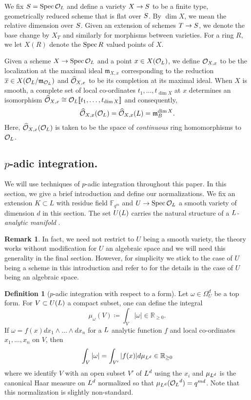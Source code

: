 \documentclass[10pt]{article}
\theoremstyle{plain}
\theoremstyle{definition}
\newtheorem{definition}[theorem]{Definition}
\newtheorem{remark}[theorem]{Remark}
\numberwithin{equation}{section}
\begin{document}
We fix $S= \operatorname{Spec}{{\mathcal O}_{L}}$ and define a variety $X \to S$ to be a finite type, geometrically reduced scheme that is flat over $S$. By $\dim X$, we mean the relative dimension over $S$. Given an extension of schemes $T \to S$, we denote the base change by $X_T$ and similarly for morphisms between varieties. For a ring $R$, we let $X(R)$ denote the $\operatorname{Spec} R$ valued points of $X$. 

Given a scheme $X\to\operatorname{Spec} {{\mathcal O}_{L}}$ and a point $x \in X({{\mathcal O}_{L}})$, we define ${\mathcal O}_{X,x}$ to be the localization at the maximal ideal $\mathfrak m_{X,x}$ corresponding to the reduction $\overline{x} \in X({{\mathcal O}_{L}}/\mathfrak m_{{\mathcal O}_{L}})$ and $\widehat{{\mathcal O}}_{X,x}$ to be its completion at its maximal ideal. When $X$ is smooth, a complete set of local co-ordinates $t_1,\dots,t_{\dim X}$ at $x$ determines an isomorphism $\widehat{{\mathcal O}}_{X,x} \cong { {\mathcal O} _{L}}[\![t_1,\dots,t_{\dim X}]\!]$ and consequently, 
\[\widehat{{\mathcal O}}_{X,x}({{\mathcal O}_{L}}) = \widehat{{\mathcal O}}_{X,x}({L}) = \mathfrak m_B^{\dim X}.\]
Here, $\widehat{{\mathcal O}}_{X,x}({{\mathcal O}_{L}})$ is taken to be the space of \emph{continuous} ring homomorphisms to ${{\mathcal O}_{L}}$.




\subsection{$p$-adic integration.}\label{section: canonical measure}

We will use techniques of $p$-adic integration throughout this paper. In this section, we give a brief introduction and define our normalizations. We fix an extension $K \subset L$ with residue field $\mathbb F_{q^m}$ and $U \to \operatorname{Spec} {{\mathcal O}_{L}}$ a smooth variety of dimension $d$ in this section. The set $U({L})$ carries the natural structure of a \emph{${L}$-analytic manifold} \cite[\S2.4]{igusa2000introduction}.

\begin{remark}
    In fact, we need not restrict to $U$ being a smooth variety, the theory works without modification for $U$ an algebraic space and we will need this generality in the final section. However, for simplicity we stick to the case of $U$ being a scheme in this introduction and refer to \cite[\S 2.1]{groechenig2020geometric} for the details in the case of $U$ being an algebraic space.
\end{remark}

\begin{definition}[$p$-adic integration with respect to a form]
Let $\omega \in \Omega_U^d$ be a top form. For $V \subset U({L})$ a compact subset, one can define the integral
\[\mu_{\omega}(V) \coloneqq \int_{V}|\omega| \in \mathbb R_{\geq 0}.\]
If $\omega = f(x)dx_1\wedge\dots\wedge dx_n$ for a ${L}$ analytic function $f$ and local co-ordinates $x_1,\dots,x_n$ on $V$, then
\[\int_{V}|\omega| = \int_{V'}|f(x)|d\mu_{{L}^d} \in \mathbb R_{\geq 0}\]
where we identify $V$ with an open subset $V'$ of ${L}^d$ using the $x_i$ and $\mu_{{L}^d}$ is the canonical Haar measure on ${L}^d$ normalized so that $\mu_{{L}^d}({{\mathcal O}_{L}}^d) = q^{md}$. Note that this normalization is slightly non-standard.

\end{definition}
\end{document}
